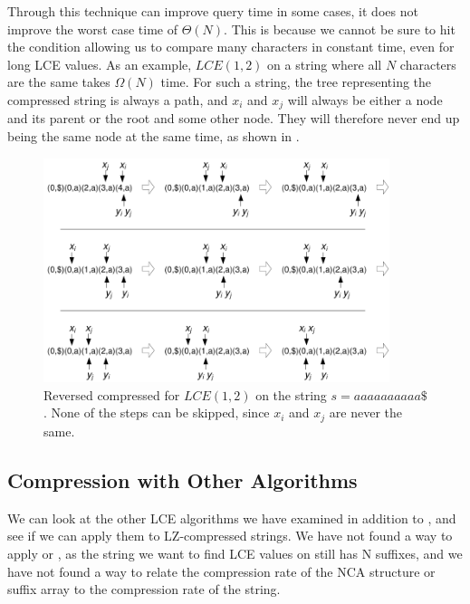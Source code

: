 \documentclass[a4]{article}
\newcommand*{\pref}{\prettyref}
\begin{document}
Through this technique can improve query time in some cases, it does not improve the worst case time of $\Theta(N)$. This is because we cannot be sure to hit the condition allowing us to compare many characters in constant time, even for long LCE values. As an example, $LCE(1,2)$ on a string where all $N$ characters are the same takes $\Omega(N)$ time. For such a string, the tree representing the compressed string is always a path, and $x_i$ and $x_j$ will always be either a node and its parent or the root and some other node. They will therefore never end up being the same node at the same time, as shown in \pref{fig:lz-no-jumps}.

\begin{figure}[tp]
    \begin{center}
        \includegraphics[width=0.9\textwidth]{lz.pdf}
    \end{center}
    \caption{\label{fig:lz-no-jumps}Reversed compressed  for $LCE(1,2)$ on the string $s=aaaaaaaaaa\$$. None of the steps can be skipped, since $x_i$ and $x_j$ are never the same.}
\end{figure}


\subsection{Compression with Other Algorithms\label{sec:lz-other}}

We can look at the other LCE algorithms we have examined in addition to , and see if we can apply them to LZ-compressed strings. We have not found a way to apply  or , as the string we want to find LCE values on still has N suffixes, and we have not found a way to relate the compression rate of the NCA structure or suffix array to the compression rate of the string.
\end{document}

